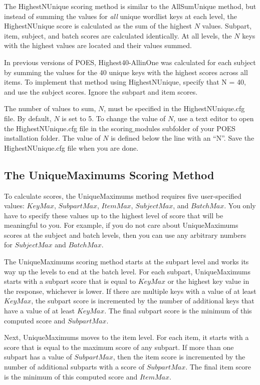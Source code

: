 \documentclass[11pt]{article}
\numberwithin{figure}{section}
\numberwithin{table}{section}
\begin{document}
The HighestNUnique scoring method is similar to the AllSumUnique method, but instead of summing the values for \emph{all} unique wordlist keys at each level, the HighestNUnique score is calculated as the sum of the highest $N$ values.   Subpart, item, subject, and batch scores are calculated identically.  At all levels, the $N$ keys with the highest values are located and their values summed.

 In previous versions of POES, Highest40-AllinOne was calculated for each subject by summing the values for the 40 unique keys with the highest scores across all items.  To implement that method using HighestNUnique, specify that N = 40, and use the subject scores.  Ignore the subpart and item scores.

The number of values to sum, $N$, must be specified in the HighestNUnique.cfg file.  By default, $N$ is set to 5.  To change the value of $N$, use a text editor to open the HighestNUnique.cfg file in the scoring$\_$modules subfolder of your POES installation folder.  The value of $N$ is defined below the line with an ``N''.  Save the HighestNUnique.cfg file when you are done.

   


\subsection{The UniqueMaximums Scoring Method} 

To calculate scores, the UniqueMaximums method requires five user-specified values: $KeyMax$, $SubpartMax$, $ItemMax$, $SubjectMax$, and $BatchMax$.  You only have to specify these values up to the highest level of score that will be meaningful to you.  For example, if you do not care about UniqueMaximums scores at the subject and batch levels, then you can use any arbitrary numbers for $SubjectMax$ and $BatchMax$.

The UniqueMaximums scoring method starts at the subpart level and works its way up the levels to end at the batch level.  For each subpart, UniqueMaximums starts with a subpart score that is equal to $KeyMax$ or the highest key value in the response, whichever is lower.  
If there are multiple keys with a value of at least $KeyMax$, the subpart score is incremented by the number of additional keys that have a value of at least $KeyMax$.  The final subpart score is the minimum of this computed score and $SubpartMax$.  

Next, UniqueMaximums moves to the item level.  For each item, it starts with a score that is equal to the maximum score of any subpart.  If more than one subpart has a value of $SubpartMax$, then the item score is incremented by the number of additional subparts with a score of $SubpartMax$.
The final item score is the minimum of this computed score and $ItemMax$.
\end{document}

